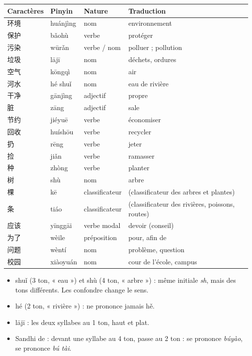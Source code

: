 \documentclass[11pt]{article}
\newcommand{\zh}[1]{\ifmmode\text{#1}\else{#1}\fi}
\begin{document}
\begin{center}
\begin{tabularx}{\linewidth}{|X|X|X|X|}
\hline
\rowcolor{popblueL} Caractères & Pinyin & Nature & Traduction \\
\hline
环境 & huánjìng & nom & environnement \\
\hline
保护 & bǎohù & verbe & protéger \\
\hline
污染 & wūrǎn & verbe / nom & polluer ; pollution \\
\hline
垃圾 & lājī & nom & déchets, ordures \\
\hline
空气 & kōngqì & nom & air \\
\hline
河水 & hé shuǐ & nom & eau de rivière \\
\hline
干净 & gānjìng & adjectif & propre \\
\hline
脏 & zāng & adjectif & sale \\
\hline
节约 & jiéyuē & verbe & économiser \\
\hline
回收 & huíshōu & verbe & recycler \\
\hline
扔 & rēng & verbe & jeter \\
\hline
捡 & jiǎn & verbe & ramasser \\
\hline
种 & zhòng & verbe & planter \\
\hline
树 & shù & nom & arbre \\
\hline
棵 & kē & classificateur & (classificateur des arbres et plantes) \\
\hline
条 & tiáo & classificateur & (classificateur des rivières, poissons, routes) \\
\hline
应该 & yīnggāi & verbe modal & devoir (conseil) \\
\hline
为了 & wèile & préposition & pour, afin de \\
\hline
问题 & wèntí & nom & problème, question \\
\hline
校园 & xiàoyuán & nom & cour de l'école, campus \\
\hline
\end{tabularx}
\end{center}

\begin{attention}
\begin{itemize}
\item \zh{水} shuǐ (3 ton, « eau ») et \zh{树} shù (4 ton, « arbre ») : même initiale \emph{sh}, mais des tons différents. Les confondre change le sens.
\item \zh{河} hé (2 ton, « rivière ») : ne prononce jamais hě.
\item \zh{垃圾} lājī : les deux syllabes au 1 ton, haut et plat.
\item Sandhi de \zh{不} : devant une syllabe au 4 ton, \zh{不} passe au 2 ton : \zh{不要} se prononce \emph{búyào}, \zh{不太} se prononce \emph{bú tài}.
\end{itemize}
\end{attention}
\end{document}
